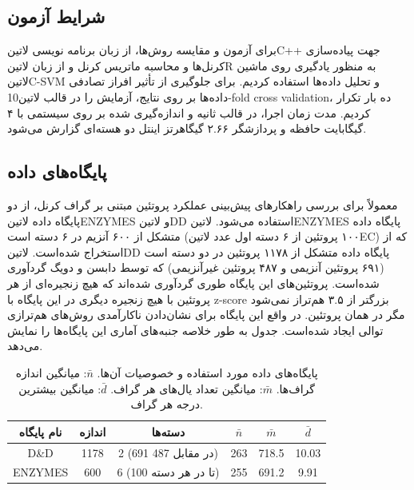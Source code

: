 \subsection{شرایط آزمون}
برای آزمون و مقایسه روش‌ها، از زبان برنامه نویسی ‌لاتین{C++} جهت پیاده‌سازی کرنل‌ها و محاسبه ماتریس کرنل و از زبان ‌لاتین{R} به منظور یادگیری روی ماشین ‌لاتین{C-SVM} و تحلیل داده‌ها استفاده کردیم. برای جلوگیری از تأثیر افراز تصادفی داده‌ها بر روی نتایج، آزمایش را در قالب ‌لاتین{10-fold cross validation}، ده بار تکرار کردیم. مدت زمان اجرا، در قالب ثانیه و اندازه‌گیری شده بر روی سیستمی با ۴ گیگابایت حافظه و پردازشگر ۲.۶۶ گیگاهرتز اینتل دو هسته‌ای گزارش می‌شود.

\subsection{پایگاه‌های داده}
معمولاً برای بررسی راهکارهای پیش‌بینی عملکرد پروتئین مبتنی بر گراف کرنل، از دو پایگاه داده ‌لاتین{ENZYMES} و ‌لاتین{DD} استفاده می‌شود. ‌لاتین{ENZYMES} پایگاه داده متشکل از ۶۰۰ آنزیم در ۶ دسته است (۱۰۰ پروتئین از ۶ دسته اول عدد ‌لاتین{EC}) که از  استخراج شده‌است. ‌لاتین{DD} پایگاه داده متشکل از ۱۱۷۸ پروتئین در دو دسته است (۶۹۱ پروتئین آنزیمی و ۴۸۷ پروتئین غیرآنزیمی) که توسط دابسن و دویگ گردآوری شده‌است. پروتئین‌های این پایگاه طوری گردآوری شده‌اند که هیچ زنجیره‌ای از هر پروتئین با هیچ زنجیره دیگری در این پایگاه با z-score بزرگتر از ۳.۵ هم‌تراز نمی‌شود مگر در همان پروتئین. در واقع این پایگاه برای نشان‌دادن ناکارآمدی روش‌های هم‌ترازی توالی ایجاد شده‌است. جدول  به طور خلاصه جنبه‌های آماری این پایگاه‌ها را نمایش می‌دهد.

\begin{table}[ht]
\centering
\begin{tabular}{| c | c | c | c | c | c |}
    \hline
    نام پایگاه & اندازه & دسته‌ها & $\bar{n}$ & $\bar{m}$ & $\bar{d}$\\[5pt] \hline
    D\&D & 1178 & 2 (691 در مقابل 487) & 263 & 718.5 & 10.03 \\ \hline
    ENZYMES & 600 & 6 (100 تا در هر دسته) & 255 & 691.2 & 9.91 \\ \hline
\end{tabular}
\caption{
    پایگاه‌های داده مورد استفاده و خصوصیات آن‌ها.
 $\bar{n}$: میانگین اندازه گراف‌ها. $\bar{m}$: میانگین تعداد یال‌های هر گراف.  $\bar{d}$: میانگین بیشترین درجه هر گراف.
}
\label{tab:dataset-statistics}
\end{table}

